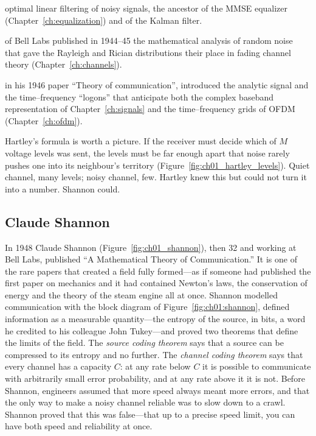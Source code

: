 \begin{description}[leftmargin=0pt,itemsep=4pt]
optimal linear filtering of noisy signals, the ancestor of the MMSE equalizer (Chapter~\ref{ch:equalization})
and of the Kalman filter.
\item[Stephen O.~Rice] of Bell Labs published in 1944--45 the mathematical analysis of random noise that
gave the Rayleigh and Rician distributions their place in fading channel theory (Chapter~\ref{ch:channels}).
\item[Dennis Gabor,] in his 1946 paper ``Theory of communication'', introduced the analytic signal and
the time--frequency ``logons'' that anticipate both the complex baseband representation of
Chapter~\ref{ch:signals} and the time--frequency grids of OFDM (Chapter~\ref{ch:ofdm}).
\end{description}

Hartley's formula is worth a picture. If the receiver must decide which of $M$ voltage levels was
sent, the levels must be far enough apart that noise rarely pushes one into its neighbour's territory
(Figure~\ref{fig:ch01_hartley_levels}). Quiet channel, many levels; noisy channel, few. Hartley knew
this but could not turn it into a number. Shannon could.



\subsection{Claude Shannon}

In 1948 Claude Shannon (Figure~\ref{fig:ch01_shannon}), then 32 and working at Bell Labs, published
``A Mathematical Theory of Communication.'' It is one of the rare papers that created a field fully
formed---as if someone had published the first paper on mechanics and it had contained Newton's laws,
the conservation of energy and the theory of the steam engine all at once. Shannon modelled
communication with the block diagram of Figure~\ref{fig:ch01:shannon}, defined information as a
measurable quantity---the entropy of the source, in bits, a word he credited to his colleague John
Tukey---and proved two theorems that define the limits of the field. The \emph{source coding theorem}
says that a source can be compressed to its entropy and no further. The \emph{channel coding theorem}
says that every channel has a capacity $C$: at any rate below $C$ it is possible to communicate with
arbitrarily small error probability, and at any rate above it it is not. Before Shannon, engineers
assumed that more speed always meant more errors, and that the only way to make a noisy channel
reliable was to slow down to a crawl. Shannon proved that this was false---that up to a precise speed
limit, you can have both speed and reliability at once.

